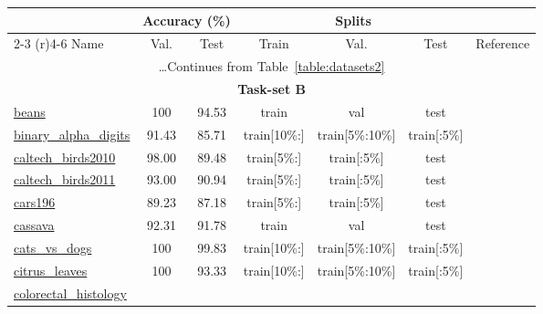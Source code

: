 \documentclass{article} \usepackage{iclr2023_conference,times}
\begin{document}
\begin{table*}[h]
\small
\caption{Datasets details (part 3 of 3).}
\label{table:datasets3}
\centering
\setlength\tabcolsep{1pt}
\begin{tabular}{lcccccc}
    \toprule
    & \multicolumn{2}{c}{Accuracy (\%)}
    & \multicolumn{3}{c}{Splits}                   \\
    \cmidrule(r){2-3}
    \cmidrule(r){4-6}
    Name & Val. & Test & Train & Val. & Test  & Reference\\
    \midrule
\multicolumn{7}{c}{\dots Continues from Table~\ref{table:datasets2} }\\
\midrule
\midrule
\multicolumn{7}{c}{\textbf{Task-set B}}\\
\midrule

\href{https://www.tensorflow.org/datasets/catalog/beans}{beans}
& 100 &  94.53 
 & train & val & test & 
 \citep{beansdata}
 \\
\href{https://www.tensorflow.org/datasets/catalog/binary_alpha_digits}{binary\_alpha\_digits}
&  91.43  &  85.71
 & train[{\tiny10\%:}] & train[{\tiny5\%:10\%}] & train[{\tiny:5\%}] &
  \\
\href{https://www.tensorflow.org/datasets/catalog/caltech_birds2010}{caltech\_birds2010}
&  98.00  &  89.48
 & train[{\tiny5\%:}] & train[{\tiny:5\%}] & test & 
 \citep{Welinder2010CaltechUCSDB2}
 \\
\href{https://www.tensorflow.org/datasets/catalog/caltech_birds2011}{caltech\_birds2011}
&  93.00  &  90.94
 & train[{\tiny5\%:}] & train[{\tiny:5\%}] & test & 
 \citep{Welinder2010CaltechUCSDB2}
 \\
\href{https://www.tensorflow.org/datasets/catalog/cars196}{cars196}
&  89.23  &  87.18
 & train[{\tiny5\%:}] & train[{\tiny:5\%}] & test & 
 \citep{Krause20133DOR}
 \\
\href{https://www.tensorflow.org/datasets/catalog/cassava}{cassava}
&  92.31  &  91.78
 & train & val & test & 
 \citep{Mwebaze2019iCassava2V}
 \\
\href{https://www.tensorflow.org/datasets/catalog/cats_vs_dogs}{cats\_vs\_dogs}
&  100 &  99.83
 & train[{\tiny10\%:}] & train[{\tiny5\%:10\%}] & train[{\tiny:5\%}] &
 \citep{Elson2007AsirraAC}
 \\
\href{https://www.tensorflow.org/datasets/catalog/citrus_leaves}{citrus\_leaves}
&  100  &  93.33
 & train[{\tiny10\%:}] & train[{\tiny5\%:10\%}] & train[{\tiny:5\%}] &
 \citep{Rauf2019ACF}
 \\
\href{https://www.tensorflow.org/datasets/catalog/colorectal_histology}{colorectal\_histology}

\end{tabular}
\end{table*}
\end{document}
